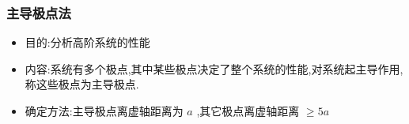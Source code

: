 \documentclass{beamer}
\begin{document}
\begin{frame}
\frametitle{主导极点法}
\label{sec-5-4}

\begin{itemize}
\item <2->目的:分析高阶系统的性能
\item <3->内容:系统有多个极点,其中某些极点决定了整个系统的性能,对系统起主导作用,称这些极点为主导极点.
\item <4->确定方法:主导极点离虚轴距离为 $a$ ,其它极点离虚轴距离 $\geq 5a$
\end{itemize}
\end{frame}
\end{document}
